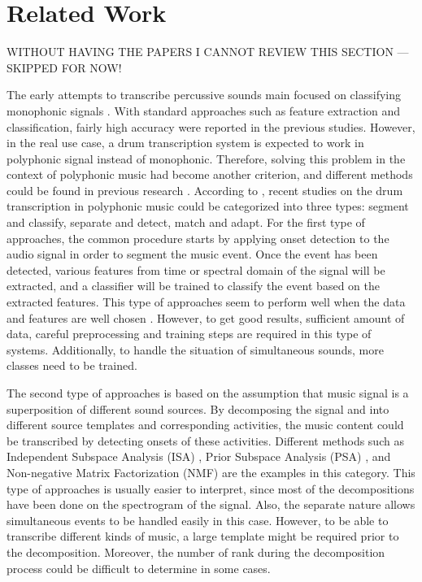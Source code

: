 \documentclass{article}
\begin{document}
\section{Related Work}\label{sec:related works}
WITHOUT HAVING THE PAPERS I CANNOT REVIEW THIS SECTION --- SKIPPED FOR NOW!

The early attempts to transcribe percussive sounds main focused on classifying monophonic signals \cite{Herrera2002}    \cite{Society2003}. With standard approaches such as feature extraction and classification, fairly high accuracy were reported in the previous studies. However, in the real use case, a drum transcription system is expected to work in polyphonic signal instead of monophonic. Therefore, solving this problem in the context of polyphonic music had become another criterion, and different methods could be found in previous research \cite{FitzGerald2003}\cite{Yoshii2004b}\cite{Dittmar2012}\cite{Dittmar2005}\cite{Tanghe2005b}\cite{Gillet2008}.  According to \cite{Gillet2008}, recent studies on the drum transcription in polyphonic music could be categorized into three types: segment and classify, separate and detect, match and adapt.  For the first type of approaches, the common procedure starts by applying onset detection to the audio signal in order to segment the music event. Once the event has been detected, various features from time or spectral domain of the signal will be extracted, and a classifier will be trained to classify the event based on the extracted features. This type of approaches seem to perform well when the data and features are well chosen \cite{Tanghe2005b}\cite{Alves2009}. However, to get good results, sufficient amount of data, careful preprocessing and training steps are required in this type of systems. Additionally, to handle the situation of simultaneous sounds, more classes need to be trained.

The second type of approaches is based on the assumption that music signal is a superposition of different sound sources. By decomposing the signal and into different source templates and corresponding activities, the music content could be transcribed by detecting onsets of these activities. Different methods such as Independent Subspace Analysis (ISA) \cite{FitzGerald2002}, Prior Subspace Analysis (PSA) \cite{FitzGerald2003}, and Non-negative Matrix Factorization (NMF) \cite{Alves2009}\cite{Paulus2005}\cite{Moreau2007} are the examples in this category. This type of approaches is usually easier to interpret, since most of the decompositions have been done on the spectrogram of the signal. Also, the separate nature allows simultaneous events to be handled easily in this case. However, to be able to transcribe different kinds of music, a large template might be required prior to the decomposition. Moreover, the number of rank during the decomposition process could be difficult to determine in some cases. 
\end{document}
